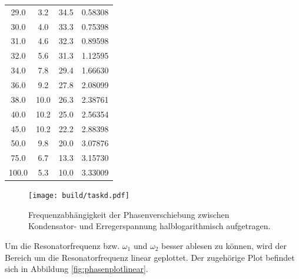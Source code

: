 \begin{table}
\begin{tabular}{cccc}
		29.0                  & 3.2                        & 34.5                       & 0.58308                 \\
		30.0                  & 4.0                        & 33.3                       & 0.75398                 \\
		31.0                  & 4.6                        & 32.3                       & 0.89598                 \\
		32.0                  & 5.6                        & 31.3                       & 1.12595                 \\
		34.0                  & 7.8                        & 29.4                       & 1.66630                 \\
		36.0                  & 9.2                        & 27.8                       & 2.08099                 \\
		38.0                  & 10.0                       & 26.3                       & 2.38761                 \\
		40.0                  & 10.2                       & 25.0                       & 2.56354                 \\
		45.0                  & 10.2                       & 22.2                       & 2.88398                 \\
		50.0                  & 9.8                        & 20.0                       & 3.07876                 \\
		75.0                  & 6.7                        & 13.3                       & 3.15730                 \\
		100.0                 & 5.3                        & 10.0                       & 3.33009                 \\
		\bottomrule
	\end{tabular}
\end{table}



\begin{figure}
	\centering
	\texttt{[image: build/taskd.pdf]}
	\caption{Frequenzabhängigkeit der Phasenverschiebung zwischen Kondensator- und Erregerspannung halblogarithmisch aufgetragen.}
	\label{fig:phasenplot}
\end{figure}

Um die Resonatorfrequenz bzw. $\omega_1$ und $\omega_2$ besser ablesen zu können, wird der Bereich um die Resonatorfrequenz linear geplottet.
Der zugehörige Plot befindet sich in Abbildung \ref{fig:phasenplotlinear}.

